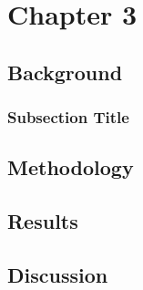 \chapter{Chapter 3}\label{ch:chapter3}
\lipsum[1-2] %

\section{Background}
\lipsum[3-4] %

\subsection{Subsection Title}
\lipsum[5] %

\section{Methodology}
\lipsum[6-7] %

\section{Results}
\lipsum[8-9] %

\section{Discussion}
\lipsum[10] %